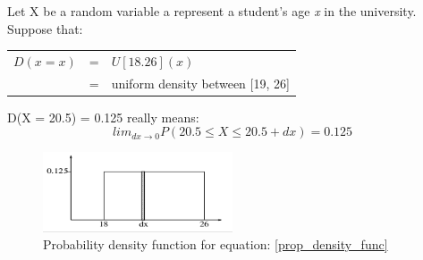 Let X be a random variable a represent a student's age \textit{x} in the university.\\
Suppose that:\\

\begin{table}
\centering
\begin{tabular}{l l l}
$D(x = x)$ & = & $U[18. 26](x)$ \\
 & = & uniform density between [19, 26]
\end{tabular}
\end{table}

D(X = 20.5) = 0.125 really means:\\
\begin{equation}\label{prop_density_func}
lim_{dx \rightarrow 0}P(20.5 \leq X \leq 20.5 + dx) = 0.125
\end{equation}

\begin{figure}[h]
\centering
\includegraphics[width=0.5\textwidth]{chap2_pics/prop_density_function.png} 
\caption{Probability density function for equation: \ref{prop_density_func}}
\end{figure}

